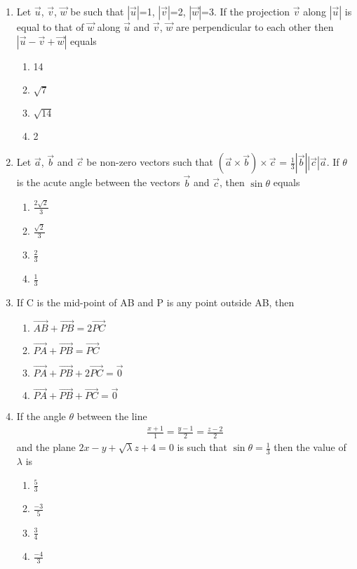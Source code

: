 \begin{enumerate}[label=\arabic*.,ref=\thesubsection.\theenumi]
\item Let $\overrightarrow{u}$, $\overrightarrow{v}$, $\overrightarrow{w}$ be such that $|\overrightarrow{u}|$=1, $|\overrightarrow{v}|$=2, $|\overrightarrow{w}|$=3. If the projection $\overrightarrow{v}$ along $|\overrightarrow{u}|$ is equal to that of $\overrightarrow{w}$ along $\overrightarrow{u}$ and $\overrightarrow{v}$, $\overrightarrow{w}$ are perpendicular to each other then $|\overrightarrow{u}-\overrightarrow{v}+\overrightarrow{w}|$ equals
\begin{enumerate}
\item 14
\item $\sqrt{7}$
\item $\sqrt{14}$
\item 2
\end{enumerate}

\item Let $\overrightarrow{a}$, $\overrightarrow{b}$ and $\overrightarrow{c}$ be non-zero vectors such that $(\overrightarrow{a} \times \overrightarrow{b}) \times \overrightarrow{c}$ = $\frac{1}{3}|\overrightarrow{b}||\overrightarrow{c}|\overrightarrow{a}$. If $\theta$ is the acute angle between the vectors $\overrightarrow{b}$ and $\overrightarrow{c}$, then $\sin\theta$ equals
\begin{enumerate}
\item $\frac{2\sqrt{2}}{3}$
\item $\frac{\sqrt{2}}{3}$
\item $\frac{2}{3}$
\item $\frac{1}{3}$
\end{enumerate}

\item If C is the mid-point of AB and P is any point outside AB, then 
\begin{enumerate}
\item $\overrightarrow{AB}+\overrightarrow{PB}=2\overrightarrow{PC}$
\item $\overrightarrow{PA}+\overrightarrow{PB}=\overrightarrow{PC}$
\item $\overrightarrow{PA}+\overrightarrow{PB}+2\overrightarrow{PC}=\overrightarrow{0}$
\item $\overrightarrow{PA}+\overrightarrow{PB}+\overrightarrow{PC}=\overrightarrow{0}$
\end{enumerate}

\item If the angle $\theta$ between the line 
\begin{align*}
\frac{x+1}{1}=\frac{y-1}{2}=\frac{z-2}{2}
\end{align*}
and the plane $2x-y+\sqrt{\lambda}z+4=0$ is such that $\sin\theta=\frac{1}{3}$ then the value of $\lambda$ is
\begin{enumerate}
\item $\frac{5}{3}$
\item $\frac{-3}{5}$
\item $\frac{3}{4}$
\item $\frac{-4}{3}$
\end{enumerate}


\end{enumerate}
